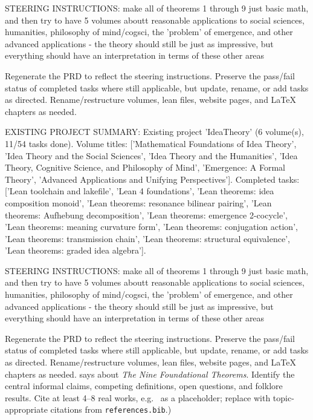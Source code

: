 STEERING INSTRUCTIONS: make all of theorems 1 through 9 just basic math, and then try to have 5 volumes aboutt reasonable applications to social sciences, humanities, philosophy of mind/cogsci, the 'problem' of emergence, and other advanced applications - the theory should still be just as impressive, but everything should have an interpretation in terms of these other areas

Regenerate the PRD to reflect the steering instructions. Preserve the pass/fail status of completed tasks where still applicable, but update, rename, or add tasks as directed. Rename/restructure volumes, lean files, website pages, and LaTeX chapters as needed.

EXISTING PROJECT SUMMARY: Existing project 'IdeaTheory' (6 volume(s), 11/54 tasks done). Volume titles: ['Mathematical Foundations of Idea Theory', 'Idea Theory and the Social Sciences', 'Idea Theory and the Humanities', 'Idea Theory, Cognitive Science, and Philosophy of Mind', 'Emergence: A Formal Theory', 'Advanced Applications and Unifying Perspectives']. Completed tasks: ['Lean toolchain and lakefile', 'Lean 4 foundations', 'Lean theorems: idea composition monoid', 'Lean theorems: resonance bilinear pairing', 'Lean theorems: Aufhebung decomposition', 'Lean theorems: emergence 2-cocycle', 'Lean theorems: meaning curvature form', 'Lean theorems: conjugation action', 'Lean theorems: transmission chain', 'Lean theorems: structural equivalence', 'Lean theorems: graded idea algebra'].

STEERING INSTRUCTIONS: make all of theorems 1 through 9 just basic math, and then try to have 5 volumes aboutt reasonable applications to social sciences, humanities, philosophy of mind/cogsci, the 'problem' of emergence, and other advanced applications - the theory should still be just as impressive, but everything should have an interpretation in terms of these other areas

Regenerate the PRD to reflect the steering instructions. Preserve the pass/fail status of completed tasks where still applicable, but update, rename, or add tasks as directed. Rename/restructure volumes, lean files, website pages, and LaTeX chapters as needed. says about \emph{The Nine Foundational Theorems}.  Identify the
        central informal claims, competing definitions, open questions, and
        folklore results.  Cite at least 4--8 real works, e.g.\ \cite{
        lean4_tpil} as a placeholder; replace with topic-appropriate
        citations from \texttt{references.bib}.)

